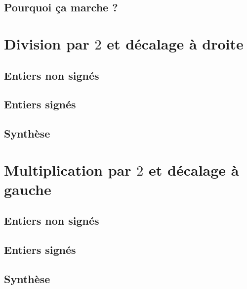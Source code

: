 \documentclass[12pt]{amsart}
\begin{document}
\subsection{Pourquoi ça marche ?}






\section{Division par $2$ et décalage à droite}

\subsection{Entiers non signés}




\subsection{Entiers signés}




\subsection{Synthèse}






\section{Multiplication par $2$ et décalage à gauche}

\subsection{Entiers non signés}




\subsection{Entiers signés}



\subsection{Synthèse}

\end{document}
